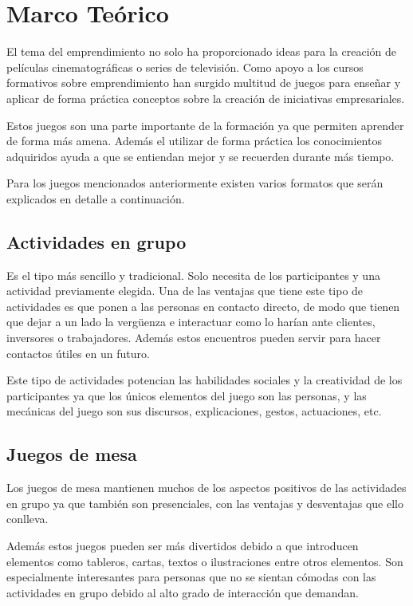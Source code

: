 \chapter{Marco Teórico}
\label{marcoteorico}

El tema del emprendimiento no solo ha proporcionado ideas para la creación de películas cinematográficas o series de televisión. Como apoyo a los cursos formativos sobre emprendimiento han surgido multitud de juegos para enseñar y aplicar de forma práctica conceptos sobre la creación de iniciativas empresariales.

Estos juegos son una parte importante de la formación ya que permiten aprender de forma más amena. Además el utilizar de forma práctica los conocimientos adquiridos ayuda a que se entiendan mejor y se recuerden durante más tiempo.

Para los juegos mencionados anteriormente existen varios formatos que serán explicados en detalle a continuación. 

\section{Actividades en grupo}

Es el tipo más sencillo y tradicional. Solo necesita de los participantes y una actividad previamente elegida. Una de las ventajas que tiene este tipo de actividades es que ponen a las personas en contacto directo, de modo que tienen que dejar a un lado la vergüenza e interactuar como lo harían ante clientes, inversores o trabajadores. Además estos encuentros pueden servir para hacer contactos útiles en un futuro.

Este tipo de actividades potencian las habilidades sociales y la creatividad de los participantes ya que los únicos elementos del juego son las personas, y las mecánicas del juego son sus discursos, explicaciones, gestos, actuaciones, etc.

\section{Juegos de mesa}

Los juegos de mesa mantienen muchos de los aspectos positivos de las actividades en grupo ya que también son presenciales, con las ventajas y desventajas que ello conlleva.

Además estos juegos pueden ser más divertidos debido a que introducen elementos como tableros, cartas, textos o ilustraciones entre otros elementos. Son especialmente interesantes para personas que no se sientan cómodas con las actividades en grupo debido al alto grado de interacción que demandan.

